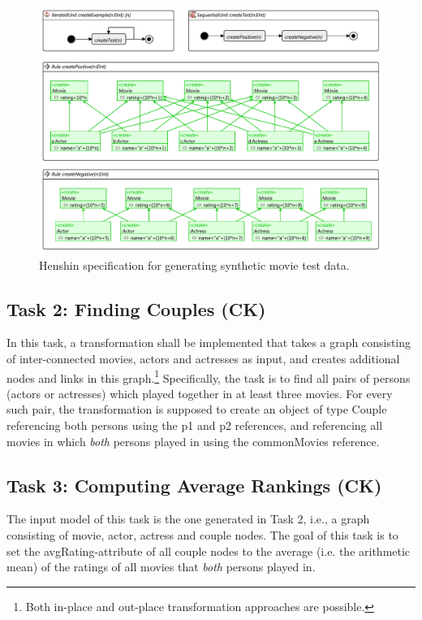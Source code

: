 \documentclass[a4paper,11pt]{article}
\newcommand{\p}[1]{\textsf{\small #1}}
\begin{document}
\begin{figure}[p]
\centering
\includegraphics[scale=1.0,angle=90]{gen-test-data3}
\caption{Henshin specification for generating synthetic movie test data.}
\label{fig:gen-test-data}
\end{figure}

\subsection{Task 2: Finding Couples (CK)}

In this task, a transformation shall be implemented that takes a graph
consisting of inter-connected movies, actors and actresses as input, and
creates additional nodes and links in this graph.\footnote{Both in-place and
  out-place transformation approaches are possible.} Specifically, the task is
to find all pairs of persons (actors or actresses) which played together in at
least three movies.  For every such pair, the transformation is supposed to
create an object of type \textsf{Couple} referencing both persons using the
\p{p1} and \p{p2} references, and referencing all movies in which
\emph{both} persons played in using the \p{commonMovies} reference.


\subsection{Task 3: Computing Average Rankings (CK)}

The input model of this task is the one generated in Task 2,
i.e., a graph consisting of movie, actor, actress and couple
nodes. The goal of this task is to set the \p{avgRating}-attribute
of all couple nodes to the average (i.e. the
arithmetic mean) of the ratings of all movies that
\emph{both} persons played in.
\end{document}
